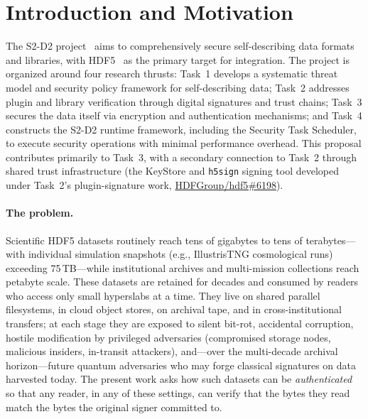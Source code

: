 \documentclass[11pt]{article}
\begin{document}
\tableofcontents
\newpage

\section{Introduction and Motivation}
\label{sec:intro}

The S2-D2 project~\cite{hdf5} aims to comprehensively secure self-describing
data formats and libraries, with HDF5~\cite{folk1999hdf5} as the primary target
for integration. The project is organized around four research thrusts:
Task~1 develops a systematic threat model and security policy framework for
self-describing data; Task~2 addresses plugin and library verification through
digital signatures and trust chains; Task~3 secures the data itself via
encryption and authentication mechanisms; and Task~4 constructs the S2-D2
runtime framework, including the Security Task Scheduler, to execute security
operations with minimal performance overhead. This proposal contributes
primarily to Task~3, with a secondary connection to Task~2 through
shared trust infrastructure (the KeyStore and \texttt{h5sign} signing tool
developed under Task~2's plugin-signature work,
\href{https://github.com/HDFGroup/hdf5/pull/6198}{HDFGroup/hdf5\#6198}).

\paragraph{The problem.}
Scientific HDF5 datasets routinely reach tens of gigabytes to tens of
terabytes---with individual simulation snapshots (e.g., IllustrisTNG
cosmological runs) exceeding 75\,TB---while institutional archives and
multi-mission collections reach petabyte scale. These datasets are retained
for decades and consumed by readers who access only small hyperslabs at a time. They live on shared parallel filesystems, in cloud
object stores, on archival tape, and in cross-institutional transfers; at
each stage they are exposed to silent bit-rot, accidental corruption, hostile
modification by privileged adversaries (compromised storage nodes, malicious
insiders, in-transit attackers), and---over the multi-decade archival
horizon---future quantum adversaries who may forge classical signatures on
data harvested today. The present work asks how such datasets can be
\emph{authenticated} so that any reader, in any of these settings, can verify
that the bytes they read match the bytes the original signer committed to.
\end{document}
